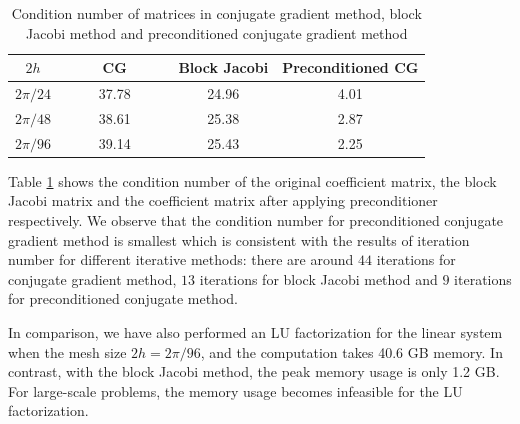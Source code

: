 \begin{table}[htbp]
	\begin{center}
		\begin{tabular}{|c|c c c|}
			\hline
			$2h$   & ~~~~ CG ~~~~& Block Jacobi & Preconditioned CG  \\
			\hline
			$2\pi/24$ &37.78& 24.96& 4.01\\
			\hline
			$2\pi/48$ &38.61 & 25.38 & 2.87\\
			\hline 
			$2\pi/96$ &39.14 &25.43 & 2.25\\
			\hline
		\end{tabular}
	\end{center}
	\caption{Condition number of matrices in conjugate gradient method, block Jacobi method and preconditioned conjugate gradient method}\label{condition_number}
\end{table} 
Table \ref{condition_number} shows the condition number of the original coefficient matrix, the block Jacobi matrix and the coefficient matrix after applying preconditioner respectively. We observe that the condition number for preconditioned conjugate gradient method is smallest which is consistent with the results of iteration number for different iterative methods: there are around $44$ iterations for conjugate gradient method, $13$ iterations for block Jacobi method and $9$ iterations for preconditioned conjugate method.

In comparison, we have also performed an LU factorization for the linear system when the mesh size $2h = 2\pi/96$, and the computation takes 40.6 GB memory. In contrast, with the block Jacobi method, the peak memory usage is only 1.2 GB. For large-scale problems, the memory usage becomes infeasible for the LU factorization. 


